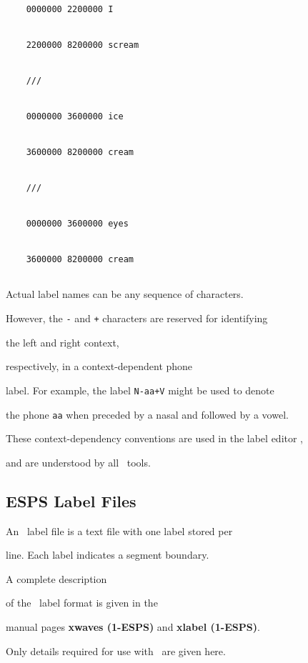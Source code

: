 \begin{verbatim}


    0000000 2200000 I


    2200000 8200000 scream


    ///


    0000000 3600000 ice


    3600000 8200000 cream


    ///


    0000000 3600000 eyes


    3600000 8200000 cream


\end{verbatim}





Actual label names can be any sequence of characters.


However, the \texttt{-} and \texttt{+} characters are reserved for identifying


the left and right context, 


respectively, in a context-dependent phone


label.  For example, the label \texttt{N-aa+V} might be used to denote


the phone \texttt{aa} when preceded by a nasal and followed by a vowel.


These context-dependency conventions are used in the label editor ,


and are understood by all \HTK\ tools.





\subsection{ESPS Label Files}





An \ESPSwaves\  label file is a text file with one label stored per


line. Each label indicates a segment boundary. 


A complete description


of the \ESPSwaves\  label format is given in the \ESPSwaves\ 


manual pages {\bf xwaves (1-ESPS)} and {\bf xlabel (1-ESPS)}.


Only details required for use with \HTK\ are given here. 





